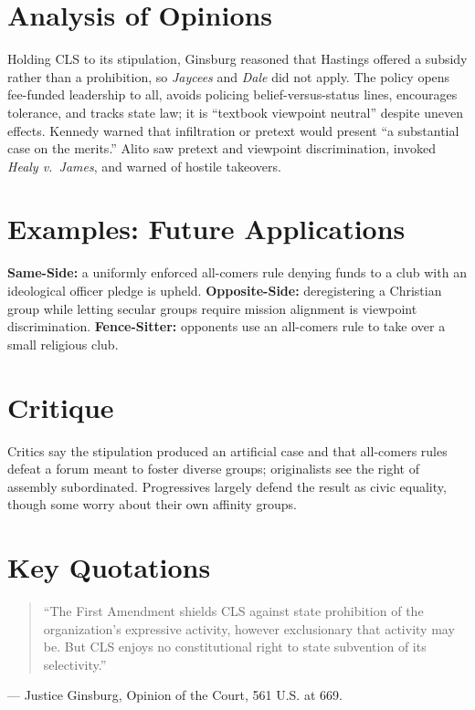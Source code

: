 \documentclass[12pt]{article}
\begin{document}
\section{Analysis of Opinions}
Holding CLS to its stipulation, Ginsburg reasoned that Hastings offered a subsidy rather than a prohibition, so \textit{Jaycees} and \textit{Dale} did not apply. The policy opens fee-funded leadership to all, avoids policing belief-versus-status lines, encourages tolerance, and tracks state law; it is ``textbook viewpoint neutral'' despite uneven effects. Kennedy warned that infiltration or pretext would present ``a substantial case on the merits.'' Alito saw pretext and viewpoint discrimination, invoked \textit{Healy v.\ James}, and warned of hostile takeovers.

\section{Examples: Future Applications}
\textbf{Same-Side:} a uniformly enforced all-comers rule denying funds to a club with an ideological officer pledge is upheld. \textbf{Opposite-Side:} deregistering a Christian group while letting secular groups require mission alignment is viewpoint discrimination. \textbf{Fence-Sitter:} opponents use an all-comers rule to take over a small religious club.

\section{Critique}
Critics say the stipulation produced an artificial case and that all-comers rules defeat a forum meant to foster diverse groups; originalists see the right of assembly subordinated. Progressives largely defend the result as civic equality, though some worry about their own affinity groups.

\section{Key Quotations}
\begin{quote}
``The First Amendment shields CLS against state prohibition of the organization's expressive activity, however exclusionary that activity may be. But CLS enjoys no constitutional right to state subvention of its selectivity.''
\end{quote}
\noindent --- Justice Ginsburg, Opinion of the Court, 561 U.S. at 669.
\end{document}
